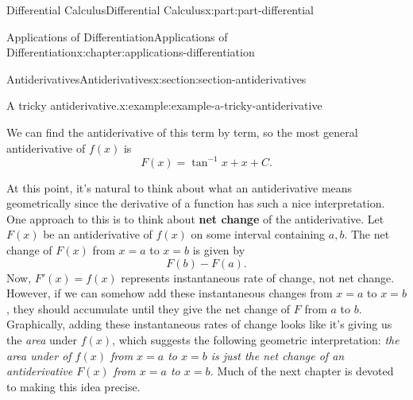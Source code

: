 \documentclass[twoside,10pt,]{tufte-book}
\newcommand{\terminology}[1]{\textbf{#1}}
\numberwithin{equation}{part}
\begin{document}
\begin{partptx}{Differential Calculus}{}{Differential Calculus}{}{}{x:part:part-differential}
\begin{chapterptx}{Applications of Differentiation}{}{Applications of Differentiation}{}{}{x:chapter:applications-differentiation}
\begin{sectionptx}{Antiderivatives}{}{Antiderivatives}{}{}{x:section:section-antiderivatives}
\begin{example}{A tricky antiderivative.}{x:example:example-a-tricky-antiderivative}
\begin{equation*}
\end{equation*}
%
\par
We can find the antiderivative of this term by term, so the most general antiderivative of \(f(x)\) is%
\begin{equation*}
F(x) = \tan^{-1}x + x + C.
\end{equation*}
%
\end{example}
At this point, it's natural to think about what an antiderivative means geometrically since the derivative of a function has such a nice interpretation. One approach to this is to think about \terminology{net change} of the antiderivative. Let \(F(x)\) be an antiderivative of \(f(x)\) on some interval containing \(a,b\). The net change of \(F(x)\) from \(x=a\) to \(x=b\) is given by%
\begin{equation*}
F(b) - F(a).
\end{equation*}
Now, \(F'(x) = f(x)\) represents instantaneous rate of change, not net change. However, if we can somehow add these instantaneous changes from \(x=a\) to \(x=b\), they should accumulate until they give the net change of \(F\) from \(a\) to \(b\). Graphically, adding these instantaneous rates of change looks like it's giving us the \emph{area} under \(f(x)\), which suggests the following geometric interpretation: \emph{the area under of \(f(x)\) from \(x=a\) to \(x=b\) is just the net change of an antiderivative \(F(x)\) from \(x=a\) to \(x=b\).} Much of the next chapter is devoted to making this idea precise.%
\end{sectionptx}
\end{chapterptx}
 \end{partptx}
%
%
\typeout{************************************************}
\typeout{************************************************}
%
\end{document}

